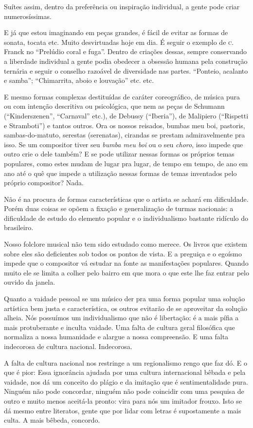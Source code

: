 Suítes assim, dentro da preferência ou inspiração individual, a gente
pode criar numerosíssimas.

E já que estou imaginando em peças grandes, é fácil de evitar as formas
de sonata, tocata etc. Muito desvirtuadas hoje em dia. É seguir o
exemplo de \textsc{c}.\,Franck no ``Prelúdio coral e fuga''. Dentro de criações
dessas, sempre conservando a liberdade individual a gente podia obedecer
a obsessão humana pela construção ternária e seguir o conselho razoável
de diversidade nas partes. ``Ponteio, acalanto e samba''; ``Chimarrita,
aboio e louvação'' etc. etc.

E mesmo formas complexas destituídas de caráter coreográfico, de música
pura ou com intenção descritiva ou psicológica, que nem as peças de
Schumann (``Kinderszenen'', ``Carnaval'' etc.), de Debussy (``Iberia''), de
Malipiero (``Rispetti e Stramboti'') e tantos outros. Ora os nossos
reisados, bumbas meu boi, pastoris, sambas-do-matuto, serestas
(serenatas), cirandas se prestam admiravelmente pra isso. Se um
compositor tiver seu \textit{bumba meu boi} ou o seu \textit{choro}, isso impede que
outro crie o dele também? E se pode utilizar nessas formas os próprios
temas populares, como estes mudam de lugar pra lugar, de tempo em tempo,
de ano em ano até o quê que impede a utilização nessas formas de temas
inventados pelo próprio compositor? Nada.

Não é na procura de formas características que o artista se achará em
dificuldade. Porém duas coisas se opõem a fixação e generalização de
turmas nacionais: a dificuldade de estudo do elemento popular e o
individualismo bastante ridículo do brasileiro.

Nosso folclore musical não tem sido estudado como merece. Os livros que
existem sobre eles são deficientes sob todos os pontos de vista. E a
preguiça e o egoísmo impede que o compositor vá estudar na fonte as
manifestações populares. Quando muito ele se limita a colher pelo bairro
em que mora o que este lhe faz entrar pelo ouvido da janela.

Quanto a vaidade pessoal se um músico der pra uma forma popular uma
solução artística bem justa e característica, os outros evitarão de se
aproveitar da solução alheia. Nós possuímos um individualismo que não é
libertação: é a mais pífia a mais protuberante e inculta vaidade. Uma
falta de cultura geral filosófica que normaliza a nossa humanidade e
alargue a nossa compreensão. E uma falta indecorosa de cultura nacional.
Indecorosa.

A falta de cultura nacional nos restringe a um regionalismo rengo que
faz dó. E o que é pior: Essa ignorância ajudada por uma cultura
internacional bêbada e pela vaidade, nos dá um conceito do plágio e da
imitação que é sentimentalidade pura. Ninguém não pode concordar,
ninguém não pode coincidir com uma pesquisa de outro e muito menos
aceitá-la pronto: vira para nós um imitador frouxo. %
Isto se dá mesmo entre literatos, gente que por lidar com letras é
supostamente a mais culta. A mais bêbeda, concordo.

